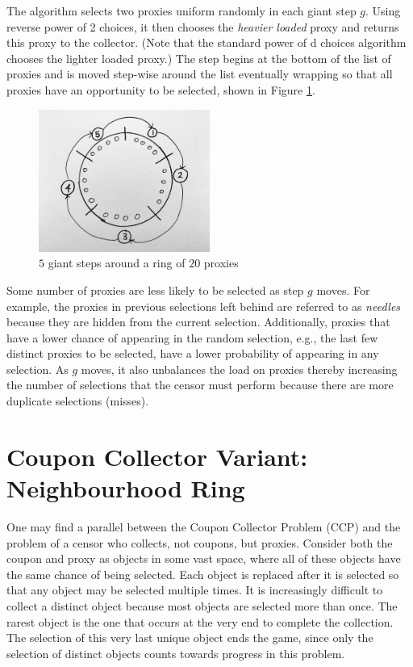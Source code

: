 The algorithm selects two proxies uniform randomly in each giant step $g$. Using reverse power of 2 choices, it then chooses the \textit{heavier loaded} proxy and returns this proxy to the collector. (Note that the standard power of d choices algorithm chooses the lighter loaded proxy.) The step begins at the bottom of the list of proxies and is moved step-wise around the list eventually wrapping so that all proxies have an opportunity to be selected, shown in Figure \ref{fig:giantstepring}.

\begin{figure}[h!]
\centering
     \includegraphics[width=0.5\textwidth]{fig/giant_step_ring.png}
    \caption{$5$ giant steps around a ring of $20$ proxies}

    \label{fig:giantstepring}
\end{figure}

Some number of proxies are less likely to be selected as step $g$ moves. For example, the proxies in previous selections left behind are referred to as \emph{needles} because they are hidden from the current selection. Additionally, proxies that have a lower chance of appearing in the random selection, e.g., the last few distinct proxies to be selected, have a lower probability of appearing in any selection. As $g$ moves, it also unbalances the load on proxies thereby increasing the number of selections that the censor must perform because there are more duplicate selections (misses).
\section{Coupon Collector Variant: Neighbourhood Ring}

One may find a parallel between the Coupon Collector Problem (CCP) and the problem of a censor who collects, not coupons, but proxies. Consider both the coupon and proxy as objects in some vast space, where all of these objects have the same chance of being selected. Each object is replaced after it is selected so that any object may be selected multiple times. It is increasingly difficult to collect a distinct object because most objects are selected more than once. The rarest object is the one that occurs at the very end to complete the collection. The selection of this very last unique object ends the game, since only the selection of distinct objects counts towards progress in this problem.

